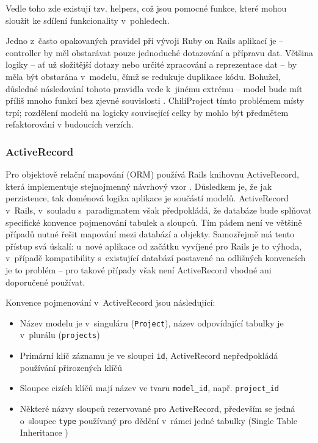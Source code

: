 \documentclass[thesis=B,czech]{FITthesis}[2012/05/02]
\begin{document}
Vedle toho zde existují tzv. helpers, což jsou pomocné funkce, které
mohou sloužit ke sdílení funkcionality v~pohledech.

Jedno z~často opakovaných pravidel při vývoji Ruby on Rails aplikací je
\citep{Buck2006} -- controller by měl
obstarávat pouze jednoduché dotazování a přípravu dat. Většina logiky --
ať už složitější dotazy nebo určité zpracování a reprezentace dat -- by
měla být obstarána v~modelu, čímž se redukuje duplikace kódu. Bohužel,
důsledné následování tohoto pravidla vede k~jinému extrému -- model bude mít
příliš mnoho funkcí bez zjevné souvislosti \citep{Libbery2011}.
ChiliProject tímto problémem místy trpí; rozdělení modelů na logicky
související celky \citep{Grimm2012} by mohlo být předmětem refaktorování
v budoucích verzích.

\subsubsection{ActiveRecord}

Pro objektově relační mapování (ORM) používá Rails knihovnu
ActiveRecord, která implementuje stejnojmenný návrhový vzor \citep[str.
160]{Fowler2003}. Důsledkem je, že jak perzistence, tak doménová logika
aplikace je součástí modelů. ActiveRecord v~Rails, v~souladu
s~paradigmatem  však předpokládá, že
databáze bude splňovat specifické konvence pojmenování tabulek a
sloupců. Tím pádem není ve většině případů nutné řešit mapování mezi
databází a objekty. Samozřejmě má tento přístup svá úskalí: u~nové
aplikace od začátku vyvíjené pro Rails je to výhoda, v~případě
kompatibility s~existující databází postavené na odlišných konvencích je
to problém -- pro takové případy však není ActiveRecord vhodné ani
doporučené používat.

Konvence pojmenování v~ActiveRecord jsou následující:
\begin{itemize}
\item Název modelu je v~singuláru (\lstinline!Project!), název odpovídající tabulky je
v~plurálu (\lstinline!projects!)
\item Primární klíč záznamu je ve sloupci \lstinline!id!, ActiveRecord nepředpokládá používání přirozených
klíčů
\item Sloupce cizích klíčů mají název ve tvaru \lstinline!model_id!,
např. \lstinline!project_id!
\item Některé názvy sloupců rezervované pro ActiveRecord, především se jedná o~sloupec \lstinline!type!
používaný pro dědění v~rámci jedné tabulky (Single Table Inheritance
\citep[str. 278]{Fowler2003})
\end{itemize}
\end{document}
